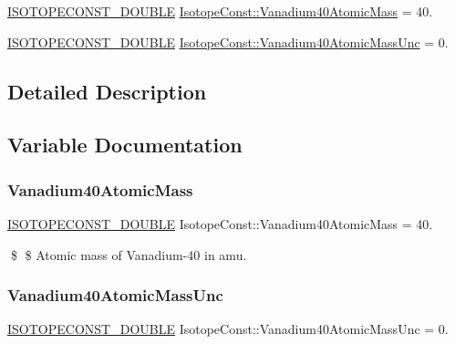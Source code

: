 \begin{DoxyCompactItemize}
\item 
\mbox{\hyperlink{group___isotope_const-_macros_ga8f45a7272ce02c0b4c65c44636ed719a}{I\+S\+O\+T\+O\+P\+E\+C\+O\+N\+S\+T\+\_\+\+D\+O\+U\+B\+LE}} \mbox{\hyperlink{group___isotope_const-_vanadium-_v40_ga007172f561e9b6e079f9f1de689834f0}{Isotope\+Const\+::\+Vanadium40\+Atomic\+Mass}} = 40.
\item 
\mbox{\hyperlink{group___isotope_const-_macros_ga8f45a7272ce02c0b4c65c44636ed719a}{I\+S\+O\+T\+O\+P\+E\+C\+O\+N\+S\+T\+\_\+\+D\+O\+U\+B\+LE}} \mbox{\hyperlink{group___isotope_const-_vanadium-_v40_gaac184d49a33dacd003ffb79a224196e7}{Isotope\+Const\+::\+Vanadium40\+Atomic\+Mass\+Unc}} = 0.
\end{DoxyCompactItemize}


\subsection{Detailed Description}


\subsection{Variable Documentation}
\mbox{\label{group___isotope_const-_vanadium-_v40_ga007172f561e9b6e079f9f1de689834f0}} 
\subsubsection{\texorpdfstring{Vanadium40\+Atomic\+Mass}{Vanadium40AtomicMass}}
{\footnotesize\ttfamily \mbox{\hyperlink{group___isotope_const-_macros_ga8f45a7272ce02c0b4c65c44636ed719a}{I\+S\+O\+T\+O\+P\+E\+C\+O\+N\+S\+T\+\_\+\+D\+O\+U\+B\+LE}} Isotope\+Const\+::\+Vanadium40\+Atomic\+Mass = 40.}

\$ \$ Atomic mass of Vanadium-\/40 in amu. \mbox{\label{group___isotope_const-_vanadium-_v40_gaac184d49a33dacd003ffb79a224196e7}} 
\subsubsection{\texorpdfstring{Vanadium40\+Atomic\+Mass\+Unc}{Vanadium40AtomicMassUnc}}
{\footnotesize\ttfamily \mbox{\hyperlink{group___isotope_const-_macros_ga8f45a7272ce02c0b4c65c44636ed719a}{I\+S\+O\+T\+O\+P\+E\+C\+O\+N\+S\+T\+\_\+\+D\+O\+U\+B\+LE}} Isotope\+Const\+::\+Vanadium40\+Atomic\+Mass\+Unc = 0.}

